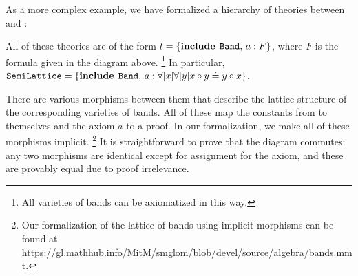 As a more complex example, we have formalized a hierarchy of theories between  and :
\begin{center}
\end{center}
All of these theories are of the form $t=\{\operatorname{\mathbf{include}}{\;\operatorname{\mathtt{Band}}},\,a: F\}$, where $F$ is the formula given in the diagram above.%
\footnote{All varieties of bands can be axiomatized in this way.}
In particular, $\operatorname{\mathtt{SemiLattice}}=\{\operatorname{\mathbf{include}}{\;\operatorname{\mathtt{Band}}},\,a: \forall [x]\forall [y] x\circ y\doteq y\circ x\}$.

There are various morphisms between them that describe the lattice structure of the corresponding varieties of bands.
All of these map the constants from  to themselves and the axiom $a$ to a proof.
In our formalization, we make all of these morphisms implicit.%
\footnote{Our formalization of the lattice of bands using implicit morphisms can be found at \url{https://gl.mathhub.info/MitM/smglom/blob/devel/source/algebra/bands.mmt}.}
It is straightforward to prove that the diagram commutes: any two morphisms are identical except for assignment for the axiom, and these are provably equal due to proof irrelevance.

